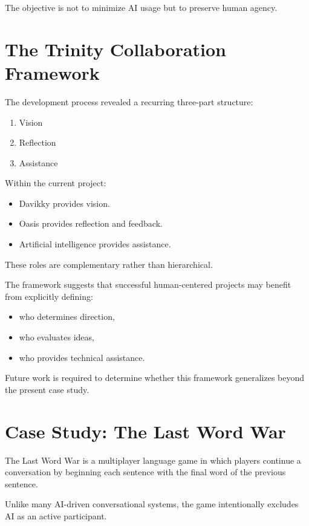 \documentclass[11pt]{article}
\begin{document}
The objective is not to minimize AI usage but to preserve human agency.

\section{The Trinity Collaboration Framework}

The development process revealed a recurring three-part structure:

\begin{enumerate}[label=\arabic*.]
\item Vision
\item Reflection
\item Assistance
\end{enumerate}

Within the current project:

\begin{itemize}
\item Davikky provides vision.
\item Oasis provides reflection and feedback.
\item Artificial intelligence provides assistance.
\end{itemize}

These roles are complementary rather than hierarchical.

The framework suggests that successful human-centered projects may benefit from explicitly defining:

\begin{itemize}
\item who determines direction,
\item who evaluates ideas,
\item who provides technical assistance.
\end{itemize}

Future work is required to determine whether this framework generalizes beyond the present case study.

\section{Case Study: The Last Word War}

The Last Word War is a multiplayer language game in which players continue a conversation by beginning each sentence with the final word of the previous sentence.

Unlike many AI-driven conversational systems, the game intentionally excludes AI as an active participant.
\end{document}
